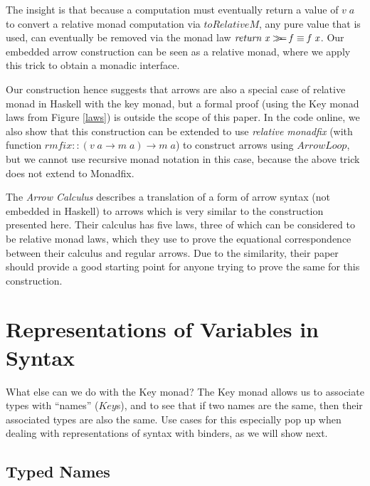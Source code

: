 \documentclass{sigplanconf}
\newcommand{\Conid}[1]{\mathit{#1}}
\newcommand{\Varid}[1]{\mathit{#1}}
\newcommand{\bind}{\mathbin{>\!\!\!>\mkern-6.7mu=}}
\begin{document}
The insight is that because a computation must eventually return a value of \ensuremath{\Varid{v}\;\Varid{a}} to convert a relative monad computation via \ensuremath{\Varid{toRelativeM}}, any pure value that is used, can eventually be removed via the monad law \ensuremath{\Varid{return}\;\Varid{x}\bind \Varid{f}\equiv \Varid{f}\;\Varid{x}}. Our embedded arrow construction can be seen as a relative monad, where we apply this trick to obtain a monadic interface.

Our construction hence suggests that arrows are also a special case of relative monad in Haskell with the key monad, but a formal proof (using the Key monad laws from Figure \ref{laws}) is outside the scope of this paper. In the code online, we also show that this construction can be extended to use \emph{relative monadfix} (with function  \ensuremath{\Varid{rmfix}\mathbin{::}(\Varid{v}\;\Varid{a}\to \Varid{m}\;\Varid{a})\to \Varid{m}\;\Varid{a}}) to construct arrows using \ensuremath{\Conid{ArrowLoop}}, but we cannot use recursive monad notation in this case, because the above trick does not extend to Monadfix.


The \emph{Arrow Calculus}\cite{arrowcalc} describes a translation of a form of arrow syntax (not embedded in Haskell) to arrows which is very similar to the construction presented here. Their calculus has five laws, three of which can be considered to be relative monad laws, which they use to prove the equational correspondence between their calculus and regular arrows. Due to the similarity, their paper should provide a good starting point for anyone trying to prove the same for this construction.

\section{Representations of Variables in Syntax}
\label{syntax}
What else can we do with the Key monad? The Key monad allows us to associate types with ``names'' (\ensuremath{\Conid{Key}}s), and to see that if two names are the same, then their associated types are also the same. Use cases for this especially pop up when dealing with representations of syntax with binders, as we will show next.

\subsection{Typed Names}
\end{document}
